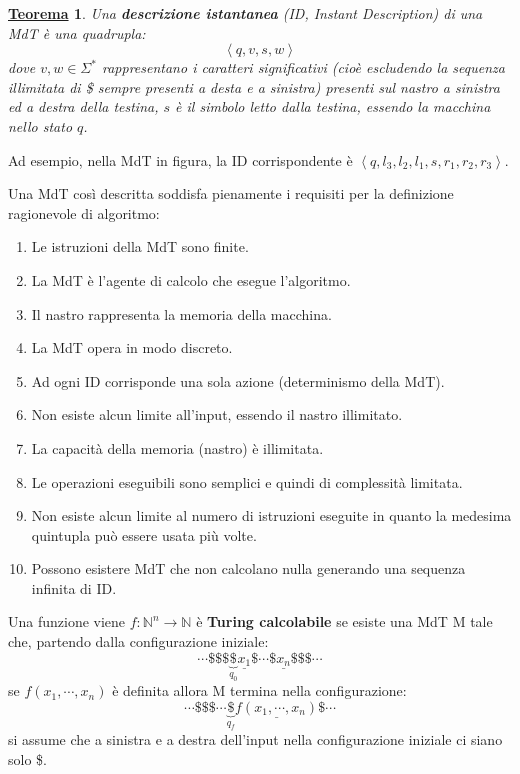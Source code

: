 \documentclass[a4paper]{article}
\newtheorem{theorem}{\textcolor{Red3}{\underline{Teorema}}}
\begin{document}
	\noindent
	\begin{theorem}
		Una \textcolor{Red3}{\textbf{descrizione istantanea}} (ID, Instant Description) di una MdT è una quadrupla:
		\begin{equation*}
			\left\langle q,v,s,w \right\rangle
		\end{equation*}
		dove $v,w \in \Sigma^{*}$ rappresentano i caratteri significativi (cioè escludendo la sequenza illimitata di \$ sempre presenti a desta e a sinistra) presenti sul nastro a sinistra ed a destra della testina, $s$ è il simbolo letto dalla testina, essendo la macchina nello stato $q$.
	\end{theorem}
	\noindent
	Ad esempio, nella MdT in figura, la ID corrispondente è $\left\langle q, l_{3}, l_{2}, l_{1}, s, r_{1}, r_{2}, r_{3} \right\rangle$.\newline
	
	\noindent
	Una MdT così descritta soddisfa pienamente i requisiti per la definizione ragionevole di algoritmo:
	\begin{enumerate}
		\item Le istruzioni della MdT sono finite.
		\item La MdT è l'agente di calcolo che esegue l'algoritmo.
		\item Il nastro rappresenta la memoria della macchina.
		\item La MdT opera in modo discreto.
		\item Ad ogni ID corrisponde una sola azione (determinismo della MdT).
		\item Non esiste alcun limite all'input, essendo il nastro illimitato.
		\item La capacità della memoria (nastro) è illimitata.
		\item Le operazioni eseguibili sono semplici e quindi di complessità limitata.
		\item Non esiste alcun limite al numero di istruzioni eseguite in quanto la medesima quintupla può essere usata più volte.
		\item Possono esistere MdT che non calcolano nulla generando una sequenza infinita di ID.
	\end{enumerate}
	Una funzione viene $f: \mathbb{N}^{n} \longrightarrow \mathbb{N}$ è \textcolor{Red3}{\textbf{Turing calcolabile}} se esiste una MdT M tale che, partendo dalla configurazione iniziale:
	\begin{equation*}
		\cdots \$\$\$ \underbrace{\$}_{q_{0}} \underline{x_{1}} \$ \cdots \$ \underline{x_{n}} \$\$\$\cdots
	\end{equation*}
	se $f\left(x_{1}, \cdots, x_{n}\right)$ è definita allora M termina nella configurazione:
	\begin{equation*}
		\cdots \$\$\$ \cdots \underbrace{\$}_{q_{f}} \underline{f\left(x_{1}, \cdots, x_{n}\right)} \$ \cdots
	\end{equation*}
	si assume che a sinistra e a destra dell'input nella configurazione iniziale ci siano solo \$.\newpage
	
\end{document}

